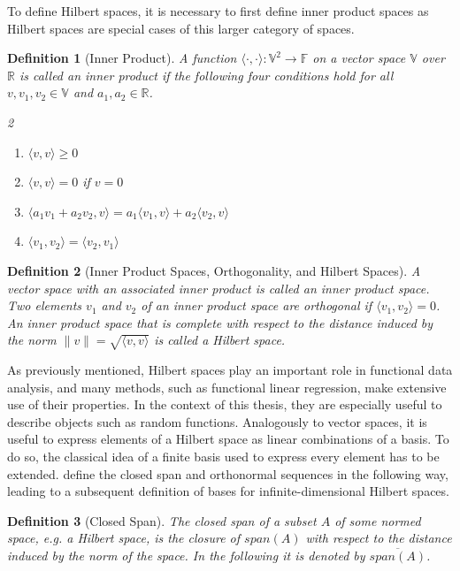\documentclass[12pt, a4paper]{article}
\theoremstyle{MAstyle} \newtheorem{assumption}{Assumption}[section]
\theoremstyle{MAstyle} \newtheorem{definition}{Definition}[section]
\theoremstyle{MAstyle} \newtheorem{theorem}{Theorem}[section]
\begin{document}
			To define Hilbert spaces, it is necessary to first define inner product spaces as Hilbert spaces are special cases of this larger category of spaces.
			\begin{definition}[Inner Product]
				A function $\langle \cdot , \cdot \rangle : \mathbb{V}^2 \rightarrow \mathbb{F}$ on a vector space $\mathbb{V}$ over $\mathbb{R}$ is called an inner product if the following four conditions hold for all $v, v_1, v_2 \in \mathbb{V}$ and $a_1, a_2 \in \mathbb{R}$.
				\begin{multicols}{2}
					\begin{enumerate}
						\item $\langle v,v \rangle \geq 0$
						\item $\langle v,v \rangle = 0$ if $v = 0$
						\item $\langle a_1 v_1 + a_2 v_2, v \rangle = a_1 \langle v_1, v \rangle + a_2 \langle v_2, v \rangle$
						\item $\langle v_1, v_2 \rangle = \langle v_2, v_1 \rangle$
					\end{enumerate}
				\end{multicols}
			\end{definition}
			
			\begin{definition}[Inner Product Spaces, Orthogonality, and Hilbert Spaces]
				A vector space with an associated inner product is called an inner product space. Two elements $v_1$ and $v_2$ of an inner product space are orthogonal if $\langle v_1, v_2 \rangle = 0$.
				An inner product space that is complete with respect to the distance induced by the norm $\| v \| = \sqrt{\langle v, v\rangle}$ is called a Hilbert space.
			\end{definition}
			As previously mentioned, Hilbert spaces play an important role in functional data analysis, and many methods, such as functional linear regression, make extensive use of their properties. In the context of this thesis, they are especially useful to describe objects such as random functions.
			Analogously to vector spaces, it is useful to express elements of a Hilbert space as linear combinations of a basis. To do so, the classical idea of a finite basis used to express every element has to be extended. \cite{hsing_theoretical_2015} define the closed span and orthonormal sequences in the following way, leading to a subsequent definition of bases for infinite-dimensional Hilbert spaces.
		
			\begin{definition}[Closed Span]
				The closed span of a subset $A$ of some normed space, e.g. a Hilbert space, is the closure of $\textit{span}\left(A\right)$ with respect to the distance induced by the norm of the space. In the following it is denoted by $\overline{{\textit{span}\left(A\right)}}$.
			\end{definition}
		
\end{document}
